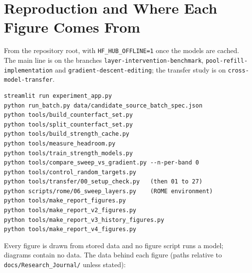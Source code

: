 \documentclass[11pt,twocolumn]{article}
\begin{document}
\section{Reproduction and Where Each Figure Comes From}
\label{app:repro}

From the repository root, with \texttt{HF\_HUB\_OFFLINE=1} once the models are cached. The main line is on the branches \texttt{layer-intervention-benchmark}, \texttt{pool-refill-implementation} and \texttt{gradient-descent-editing}; the transfer study is on \texttt{cross-model-transfer}.

{\small\begin{verbatim}
streamlit run experiment_app.py
python run_batch.py data/candidate_source_batch_spec.json
python tools/build_counterfact_set.py
python tools/split_counterfact_set.py
python tools/build_strength_cache.py
python tools/measure_headroom.py
python tools/train_strength_models.py
python tools/compare_sweep_vs_gradient.py --n-per-band 0
python tools/control_random_targets.py
python tools/transfer/00_setup_check.py   (then 01 to 27)
python scripts/rome/06_sweep_layers.py    (ROME environment)
python tools/make_report_figures.py
python tools/make_report_v2_figures.py
python tools/make_report_v3_history_figures.py
python tools/make_report_v4_figures.py
\end{verbatim}}

Every figure is drawn from stored data and no figure script runs a model; diagrams contain no data. The data behind each figure (paths relative to \texttt{docs/Research\_Journal/} unless stated):
\end{document}
